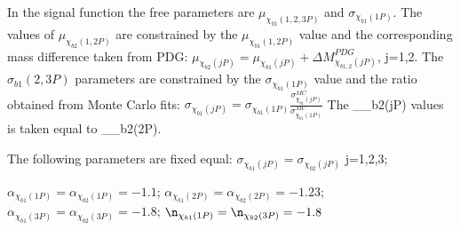 In the signal function the free parameters are $\mu_{\chi_{b1}(1,2,3P)}$ and $\sigma_{\chi_{b1}(1P)}$.
The values of $\mu_{\chi_{b2}(1,2P)}$ are constrained by the $\mu_{\chi_{b1}(1,2P)}$ value and the corresponding mass difference taken from PDG: 
 $\mu_{\chi_{b2}(jP)} = \mu_{\chi_{b1}(jP)} + \Delta M_{\chi_{b1,2}(jP)}^{PDG}$, j=1,2. The $\sigma_{b1}(2,3P)$ parameters are constrained by the 
  $\sigma_{\chi_{b1}(1P)}$ value and the ratio obtained from Monte Carlo fits: $\sigma_{\chi_{b1}(jP)} = \sigma_{\chi_{b1}(1P)}\frac{\sigma_{\chi_{b1}(jP)}^{MC}}{\sigma_{\chi_{b1}(1P)}^{MC}}$  
The \sigma_{\chi_{b2}(jP)} values is taken equal to \sigma_{\chi_{b2}(2P)}. 

 The following parameters are fixed equal: $\sigma_{\chi_{b1}(jP)}=\sigma_{\chi_{b2}(jP)}$ j=1,2,3;


$\alpha_{\chi_{b1}(1P)}=\alpha_{\chi_{b2}(1P)}=-1.1$;  $\alpha_{\chi_{b1}(2P)}=\alpha_{\chi_{b2}(2P)}=-1.23$;  $\alpha_{\chi_{b1}(3P)}=\alpha_{\chi_{b2}(3P)}=-1.8$; $\n_{\chi_{b1}(1P)}=\n_{\chi_{b2}(3P)}=-1.8$

